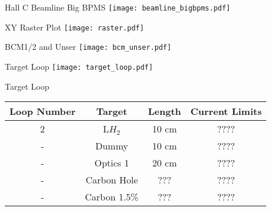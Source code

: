 \begin{Mfigure}{Hall C Beamline Big BPMS}
  \centering
  \texttt{[image: beamline\_bigbpms.pdf]}
  \caption{Schematic of the Hall C beamline downstream, showing the Big BPMs (IPM3H08, IPM3H09) near the beam dump..}
  \label{fig:2-2_beamline_bigbpms}
\end{Mfigure}

\begin{Mfigure}{XY Raster Plot}
  \centering
  \texttt{[image: raster.pdf]}
  \caption{Fast raster XY plot of run 6881 during 4.9 GeV. The uniform beam dispersion is evident by the teal homogeneity which corresponds to ~15 events per bin.}
  \label{fig:2-2_raster}
\end{Mfigure}

\begin{Mfigure}{BCM1/2 and Unser}
  \centering
  \texttt{[image: bcm\_unser.pdf]}
  \captionsetup{width=0.95\textwidth} %
  \caption{Drawing showing BCM1 and BCM2 on either side of the Unser monitor. A Unser wire calibration can be performed by passing a wire (labeled calibration wire), with an accurately known current, through the Unser monitor to measure the gain of the electronic chain.}
  \label{fig:2-2_bcm_unser}
\end{Mfigure}

%
%

\begin{Mfigure}{Target Loop}
  \centering
  \texttt{[image: target\_loop.pdf]}
  \caption{ CAD view of the cryogenic and solid target ladders. There are three cyrogenic loops above the solid target ladder.}
  \label{fig:2-3_target_loop}
\end{Mfigure}

\begin{Mtable}{Target Loop}
  \centering
  \begin{tabular}{|c|c|c|c|}
    \hline
    \textbf{Loop Number} & \textbf{Target} & \textbf{Length} & \textbf{Current Limits} \\
    \hline
    2 & L$H_2$ & 10 cm & ???? \\
    - & Dummy & 10 cm  & ???? \\
    - & Optics 1 & 20 cm  & ???? \\
    - & Carbon Hole & ???  & ???? \\
    - & Carbon 1.5\% & ???  & ???? \\
    \hline
    \end{tabular}
  \caption{Break down of all targets available during the running period. The three cryogenic targets are labeled alongside their corresponding loops. The target length is also provided for each type.}
  \label{tab:2-3_target_loop}
\end{Mtable}

